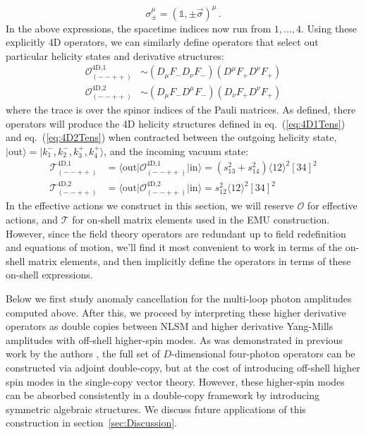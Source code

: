 \documentclass[11pt,letter]{article}
\def\sec#1{section~\ref{#1}}
\def\eqn#1{eq.~(\ref{#1})}
\begin{document}
\begin{equation}
\sigma_\pm^\mu = (\mathbb{1},\pm \vec{\sigma})^\mu\,.
\end{equation}
In the above expressions, the spacetime indices now run from $1,...,4$. Using these explicitly 4D operators, we can similarly define operators that select out particular helicity states and derivative structures:
\begin{align}
\mathcal{O}^{\text{4D,1}}_{(--++)} &\sim (D_\mu F_- D_\nu F_-)(D^\mu F_+ D^\nu F_+)
\\
\mathcal{O}^{\text{4D,2}}_{(--++)} &\sim (D_\mu F_- D^\mu F_-)(D_\nu F_+ D^\nu F_+)
\end{align}
where the trace is over the spinor indices of the Pauli matrices. As defined, there operators will produce the 4D helicity structures defined in \eqn{eq:4D1Tens} and \eqn{eq:4D2Tens} when contracted between the outgoing helicity state, $|\text{out}\rangle = |k_1^-,k_2^-,k_3^+,k_4^+\rangle$, and the incoming vacuum state:
\begin{align}
\mathcal{T}^{\text{4D,1}}_{(--++)} &=\langle \text{out}\big| \mathcal{O}^{\text{4D,1}}_{(--++)}  \big|\text{in}\rangle = (s_{13}^2 +s_{14}^2)\langle 12\rangle^2[34]^2
\\
\mathcal{T}^{\text{4D,2}}_{(--++)} &= \langle \text{out}\big|\mathcal{O}^{\text{4D,2}}_{(--++)}  \big|\text{in}\rangle =s_{12}^2 \langle 12\rangle^2[34]^2
\end{align}
In the effective actions we construct in this section, we will reserve $\mathcal{O}$ for effective actions, and $\mathcal{T}$ for on-shell matrix elements used in the EMU construction. However, since the field theory operators are redundant up to field redefinition and equations of motion, we'll find it most convenient to work in terms of the on-shell matrix elements, and then implicitly define the operators in terms of these on-shell expressions. 

Below we first study anomaly cancellation for the multi-loop photon amplitudes computed above. After this, we proceed by interpreting these higher derivative operators as double copies between NLSM and higher derivative Yang-Mills amplitudes with off-shell higher-spin modes. As was demonstrated in previous work by the authors \cite{Carrasco:2022jxn}, the full set of $D$-dimensional four-photon operators can be constructed via adjoint double-copy, but at the cost of introducing off-shell higher spin modes in the single-copy vector theory. However, these higher-spin modes can be absorbed consistently in a double-copy framework by introducing symmetric algebraic structures. We discuss future applications of this construction in \sec{sec:Discussion}.
\end{document}
